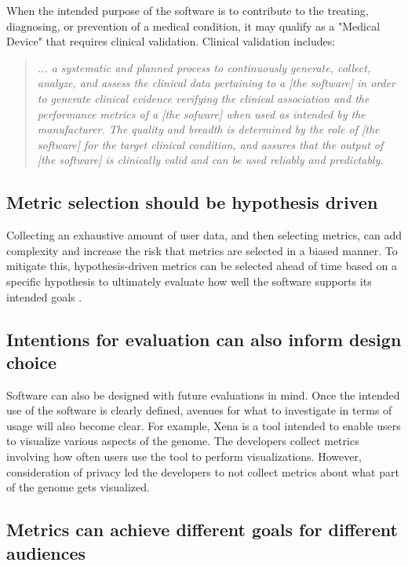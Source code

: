 \documentclass{article}
\begin{document}
When the intended purpose of the software is to contribute to the treating, diagnosing, or prevention of a medical condition, it may qualify as a "Medical Device" that requires clinical validation. Clinical validation includes:

\begin{quote}
\textit{... a systematic and planned process to continuously generate, collect, analyze, and assess the clinical data pertaining to a [the software] in order to generate clinical evidence verifying the clinical association and the performance metrics of a [the sofware] when used as intended by the manufacturer. The quality and breadth is determined by the role of [the software] for the target clinical condition, and assures that the output of [the software] is clinically valid and can be used reliably and predictably.}\cite{clinical_evaluation_2017}
\end{quote}

\subsection{Metric selection should be hypothesis driven} 
\label{sec:hypothesis_driven}
Collecting an exhaustive amount of user data, and then selecting metrics, can add complexity and increase the risk that metrics are selected in a biased manner. To mitigate this, hypothesis-driven metrics can be selected ahead of time based on a specific hypothesis to ultimately evaluate how well the software supports its intended goals \cite{design_driven_dev_2020}. 


\subsection{Intentions for evaluation can also inform design choice} Software can also be designed with future evaluations in mind. Once the intended use of the software is clearly defined, avenues for what to investigate in terms of usage will also become clear. For example, Xena \cite{xena_2020} is a tool intended to enable users to visualize various aspects of the genome. The developers collect metrics involving how often users use the tool to perform visualizations. However, consideration of privacy led the developers to not collect metrics about what part of the genome gets visualized. 




\subsection{Metrics can achieve different goals for different audiences}
\end{document}
